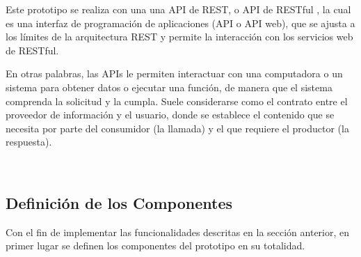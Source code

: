Este prototipo se realiza con una una API de REST, o API de RESTful \cite{api}, la cual es una interfaz de programación de aplicaciones (API o API web), que se ajusta a los límites de la arquitectura REST y permite la interacción con los servicios web de RESTful.

En otras palabras, las APIs le permiten interactuar con una computadora o un sistema para obtener datos o ejecutar una función, de manera que el sistema comprenda la solicitud y la cumpla. Suele considerarse como el contrato entre el proveedor de información y el usuario, donde se establece el contenido que se necesita por parte del consumidor (la llamada) y el que requiere el productor (la respuesta).

\\
\subsection{Definición de los Componentes}

Con el fin de implementar las funcionalidades descritas en la sección anterior, en primer lugar se definen los componentes del prototipo en su totalidad.

